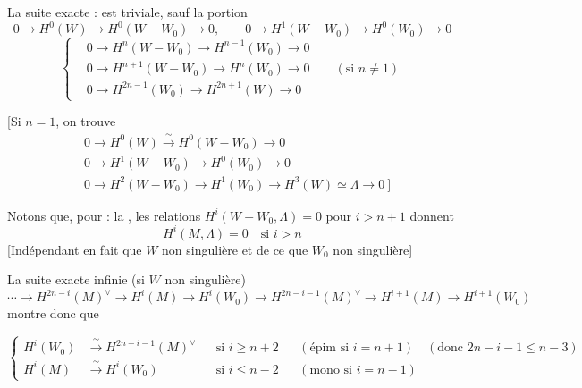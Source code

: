 \documentclass[11pt,a4paper]{article}
\begin{document}
La suite exacte \ill{} : \ill{} est triviale, sauf la portion
\[
  0 \to H^{0}(W) \to H^{0}(W - W_0) \to 0, \qquad
  0 \to H^{1}(W - W_0) \to H^{0}(W_0) \to 0
\]
\[
  \left\{\begin{aligned}
    &0 \to H^{n}(W - W_0) \to H^{n-1}(W_0) \to 0 \\
    &0 \to H^{n+1}(W - W_0) \to H^{n}(W_0) \to 0 \qquad (\text{si } n \neq 1) \\
    &0 \to H^{2n-1}(W_0) \to H^{2n+1}(W) \to 0
  \end{aligned}\right.
\]

[Si $n = 1$, on trouve
\[
  \begin{aligned}
    &0 \to H^{0}(W) \xrightarrow{\ \sim\ } H^{0}(W - W_0) \to 0 \\
    &0 \to H^{1}(W - W_0) \to H^{0}(W_0) \to 0 \\
    &0 \to H^{2}(W - W_0) \to H^{1}(W_0) \to H^{3}(W) \simeq \Lambda \to 0 \ ]
  \end{aligned}
\]

Notons que, pour \ill{} : la \ill{}, \struck{\ill{}} les relations
$H^{i}(W - W_0, \Lambda) = 0$ pour $i > n+1$ donnent
\[
  \boxed{\ H^{i}(M, \Lambda) = 0 \quad \text{si } i > n\ }
\]
[Indépendant en fait \ill{} que $W$ non singulière et de ce que $W_0$ non singulière]

La suite exacte infinie (si $W$ non singulière)
\[
  \cdots \to H^{2n-i}(M)^\vee \to H^{i}(M) \to H^{i}(W_0) \to
  H^{2n-i-1}(M)^\vee \to H^{i+1}(M) \to H^{i+1}(W_0)
\]
montre donc que 



\[
  \left\{\begin{aligned}
    H^{i}(W_0) &\xrightarrow{\ \sim\ } H^{2n-i-1}(M)^\vee && \text{si } i \geq n+2
      && (\text{épim si } i = n+1) \quad (\text{donc } 2n-i-1 \leq n-3) \\
    H^{i}(M) &\xrightarrow{\ \sim\ } H^{i}(W_0) && \text{si } i \leq n-2
      && (\text{mono si } i = n-1)
  \end{aligned}\right.
\]
\end{document}
